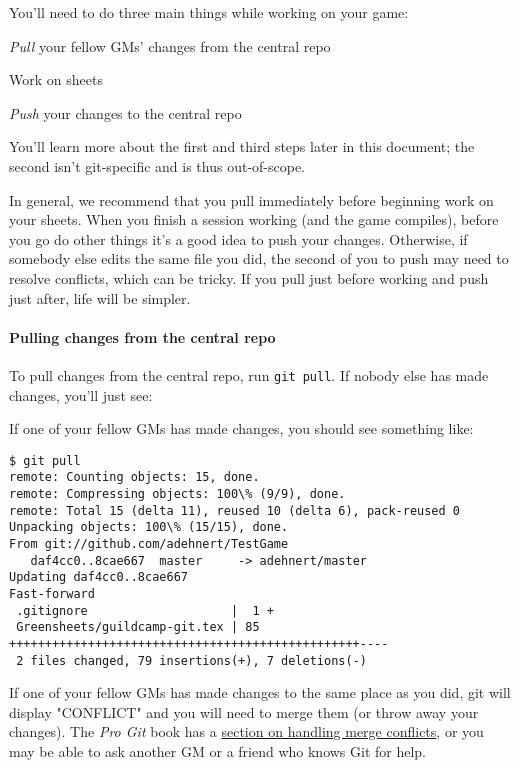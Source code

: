 \documentclass[green]{testgame}
\begin{document}
You'll need to do three main things while working on your game:
\begin{enum}[]
\item \emph{Pull} your fellow GMs' changes from the central repo
\item Work on sheets
\item \emph{Push} your changes to the central repo
\end{enum}

You'll learn more about the first and third steps later in this document; the second isn't git-specific and is thus out-of-scope.

In general, we recommend that you pull immediately before beginning work on your sheets. When you finish a session working (and the game compiles), before you go do other things it's a good idea to push your changes. Otherwise, if somebody else edits the same file you did, the second of you to push may need to resolve conflicts, which can be tricky. If you pull just before working and push just after, life will be simpler.

\paragraph*{Pulling changes from the central repo}

To pull changes from the central repo, run \texttt{git pull}. If nobody else has made changes, you'll just see:\\

If one of your fellow GMs has made changes, you should see something like:
\begin{verbatim}
$ git pull
remote: Counting objects: 15, done.
remote: Compressing objects: 100\% (9/9), done.
remote: Total 15 (delta 11), reused 10 (delta 6), pack-reused 0
Unpacking objects: 100\% (15/15), done.
From git://github.com/adehnert/TestGame
   daf4cc0..8cae667  master     -> adehnert/master
Updating daf4cc0..8cae667
Fast-forward
 .gitignore                    |  1 +
 Greensheets/guildcamp-git.tex | 85 +++++++++++++++++++++++++++++++++++++++++++++++++----
 2 files changed, 79 insertions(+), 7 deletions(-)
\end{verbatim}

If one of your fellow GMs has made changes to the same place as you did, git will display "CONFLICT" and you will need to merge them (or throw away your changes). The \emph{Pro Git} book has a \href{https://git-scm.com/book/en/v2/Git-Branching-Basic-Branching-and-Merging#_basic_merge_conflicts}{section on handling merge conflicts}, or you may be able to ask another GM or a friend who knows Git for help.
\end{document}
